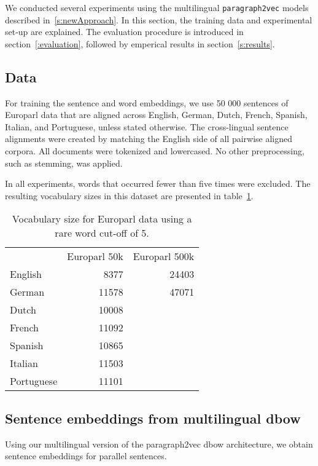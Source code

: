 
We conducted several experiments using the multilingual \texttt{paragraph2vec} models described in~\ref{s:newApproach}. In this section, the training data and experimental set-up are explained. The evaluation procedure is introduced in section~\ref{:evaluation}, followed by emperical results in section~\ref{s:results}.

\subsection{Data}
For training the sentence and word embeddings, we use 50 000 sentences of Europarl data that are aligned across English, German, Dutch, French, Spanish, Italian, and Portuguese, unless stated otherwise. The cross-lingual sentence alignments were created by matching the English side of all pairwise aligned corpora.
All documents were tokenized and lowercased. No other preprocessing, such as stemming, was applied.


In all experiments, words that occurred fewer than five times were excluded.
The resulting vocabulary sizes in this dataset are presented  in table~\ref{t:vocabularies}.

\begin{table}
\center
\begin{tabular}{l r r}
		&Europarl 50k 	&Europarl 500k\\
English	&8377			&24403	\\	
German	&11578		&47071	\\
Dutch		&10008				\\
French	&11092				\\	
Spanish	&10865				\\
Italian		&11503				\\
Portuguese	&11101				\\
\end{tabular}
\caption{Vocabulary size for Europarl data using a rare word cut-off of 5.}
\label{t:vocabularies}
\end{table}


\subsection{Sentence embeddings from multilingual dbow}

Using our multilingual version of the paragraph2vec dbow architecture, we obtain sentence embeddings for parallel sentences. 




